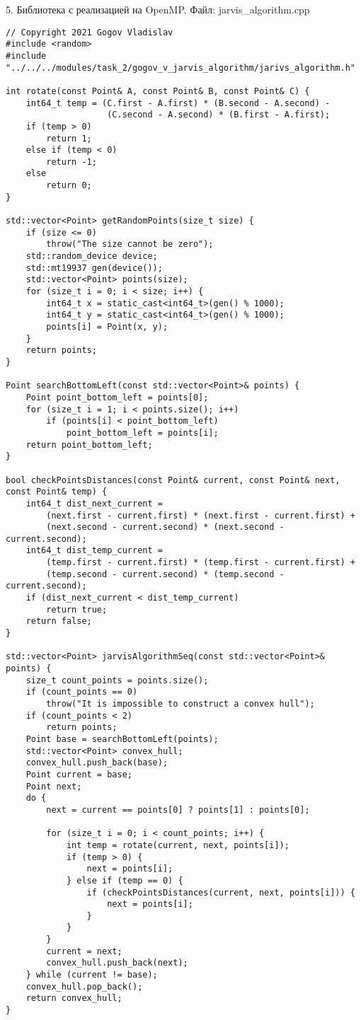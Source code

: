 \documentclass{report}
\begin{document}
\par 5. Библиотека с реализацией на OpenMP. Файл: jarvis\_algorithm.cpp
\begin{lstlisting}
// Copyright 2021 Gogov Vladislav
#include <random>
#include "../../../modules/task_2/gogov_v_jarvis_algorithm/jarivs_algorithm.h"

int rotate(const Point& A, const Point& B, const Point& C) {
    int64_t temp = (C.first - A.first) * (B.second - A.second) -
                    (C.second - A.second) * (B.first - A.first);
    if (temp > 0)
        return 1;
    else if (temp < 0)
        return -1;
    else
        return 0;
}

std::vector<Point> getRandomPoints(size_t size) {
    if (size <= 0)
        throw("The size cannot be zero");
    std::random_device device;
    std::mt19937 gen(device());
    std::vector<Point> points(size);
    for (size_t i = 0; i < size; i++) {
        int64_t x = static_cast<int64_t>(gen() % 1000);
        int64_t y = static_cast<int64_t>(gen() % 1000);
        points[i] = Point(x, y);
    }
    return points;
}

Point searchBottomLeft(const std::vector<Point>& points) {
    Point point_bottom_left = points[0];
    for (size_t i = 1; i < points.size(); i++)
        if (points[i] < point_bottom_left)
            point_bottom_left = points[i];
    return point_bottom_left;
}

bool checkPointsDistances(const Point& current, const Point& next, const Point& temp) {
    int64_t dist_next_current =
        (next.first - current.first) * (next.first - current.first) +
        (next.second - current.second) * (next.second - current.second);
    int64_t dist_temp_current =
        (temp.first - current.first) * (temp.first - current.first) +
        (temp.second - current.second) * (temp.second - current.second);
    if (dist_next_current < dist_temp_current)
        return true;
    return false;
}

std::vector<Point> jarvisAlgorithmSeq(const std::vector<Point>& points) {
    size_t count_points = points.size();
    if (count_points == 0)
        throw("It is impossible to construct a convex hull");
    if (count_points < 2)
        return points;
    Point base = searchBottomLeft(points);
    std::vector<Point> convex_hull;
    convex_hull.push_back(base);
    Point current = base;
    Point next;
    do {
        next = current == points[0] ? points[1] : points[0];

        for (size_t i = 0; i < count_points; i++) {
            int temp = rotate(current, next, points[i]);
            if (temp > 0) {
                next = points[i];
            } else if (temp == 0) {
                if (checkPointsDistances(current, next, points[i])) {
                    next = points[i];
                }
            }
        }
        current = next;
        convex_hull.push_back(next);
    } while (current != base);
    convex_hull.pop_back();
    return convex_hull;
}


\end{lstlisting}
\end{document}

